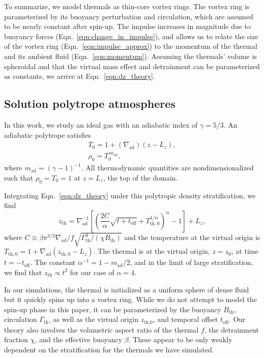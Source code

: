 \documentclass[twocolumn, amsmath, amsfonts, amssymb, trackchanges]{aastex62}
\newcommand{\grad}{\ensuremath{\nabla}}
\begin{document}
To summarize, we model thermals as thin-core vortex rings.
The vortex ring is parameterized by its buoyancy perturbation and circulation, which are assumed to be nearly constant after spin-up.
The impulse increases in magnitude due to buoyancy forces (Eqn.~\ref{eqn:change_in_impulse}), and allows us to relate the size of the vortex ring (Eqn.~\ref{eqn:impulse_approx}) to the momentum of the thermal and its ambient fluid (Eqn.~\ref{eqn:momentum}).
Assuming the thermals' volume is spheroidal and that the virtual mass effect and detrainment can be parameterized as constants, we arrive at Eqn.~\ref{eqn:dz_theory}.

\subsection{Solution polytrope atmospheres}
In this work, we study an ideal gas with an adiabatic index of $\gamma = 5/3$.
An adiabatic polytrope satisfies
\begin{gather}\label{eqn:T0}
T_0 = 1 + (\grad_{\text{ad}})(z - L_z), \\
\rho_0 = T_0^{\,m_{\text{ad}}},
\label{eqn:polytrope}
\end{gather}
where $m_{\text{ad}} = (\gamma-1)^{-1}$.
All thermodynamic quantities are nondimensionalized such that $\rho_0 = T_0 = 1$ at $z = L_z$, the top of the domain.

Integrating Eqn.~\ref{eqn:dz_theory} under this polytropic density stratification, we find
\begin{equation}
z_{\text{th}} = \grad_{\text{ad}}^{-1}\left[\left(\frac{2C}{ \alpha } \sqrt{t + t_{\text{off}}} + T_{\text{th},0}^{1/\alpha}  \right)^{\alpha} - 1\right] + L_z,
\label{eqn:theory_z}
\end{equation}
where $C \equiv \beta \pi^{3/2} \grad_{\text{ad}} / f \sqrt{\Gamma_{\text{th}}^3/(\chi B_{\text{th}})}$ and the temperature at the virtual origin is $T_{\text{th},0} = 1 + \grad_{\text{ad}}(z_{\text{th},0} - L_z)$.
The thermal is at the virtual origin, $z=z_0$, at time $t=-t_{\text{off}}$.
The constant $\alpha^{-1} = 1 - m_{\text{ad}}/2$, and in the limit of large stratification, we find that $z_{\text{th}} \propto t^2$ for our case of $\alpha = 4$. 

In our simulations, the thermal is initialized as a uniform sphere of dense fluid but it quickly spins up into a vortex ring. 
While we do not attempt to model the spin-up phase in this paper, it can be parameterized by the buoyancy $B_{\text{th}}$, circulation $\Gamma_{\text{th}}$, as well as the virtual origin $z_{\text{th,0}}$, and temporal offset $t_{\text{off}}$. 
Our theory also involves the volumetric aspect ratio of the thermal $f$, the detrainment fraction $\chi$, and the effective buoyancy $\beta$. 
These appear to be only weakly dependent on the stratification for the thermals we have simulated.
\end{document}
